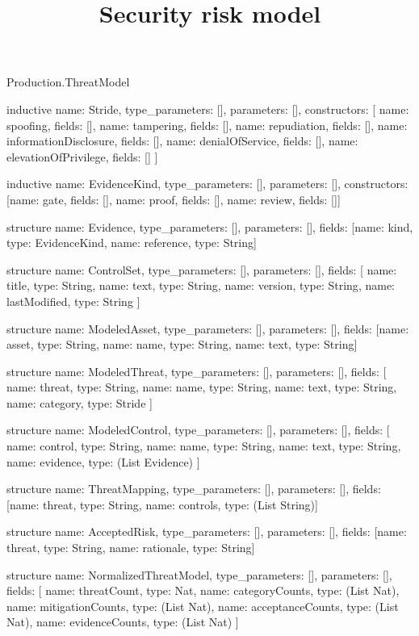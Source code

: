 \begin{lexlean}{Production.ThreatModel}
\title{Security risk model}
\begin{semanticmodule}
inductive{
  name: Stride,
  type_parameters: [],
  parameters: [],
  constructors: [
    {name: spoofing, fields: []},
    {name: tampering, fields: []},
    {name: repudiation, fields: []},
    {name: informationDisclosure, fields: []},
    {name: denialOfService, fields: []},
    {name: elevationOfPrivilege, fields: []}
  ]
}

inductive{
  name: EvidenceKind,
  type_parameters: [],
  parameters: [],
  constructors: [{name: gate, fields: []}, {name: proof, fields: []}, {name: review, fields: []}]
}

structure{
  name: Evidence,
  type_parameters: [],
  parameters: [],
  fields: [{name: kind, type: EvidenceKind}, {name: reference, type: String}]
}

structure{
  name: ControlSet,
  type_parameters: [],
  parameters: [],
  fields: [
    {name: title, type: String},
    {name: text, type: String},
    {name: version, type: String},
    {name: lastModified, type: String}
  ]
}

structure{
  name: ModeledAsset,
  type_parameters: [],
  parameters: [],
  fields: [{name: asset, type: String}, {name: name, type: String}, {name: text, type: String}]
}

structure{
  name: ModeledThreat,
  type_parameters: [],
  parameters: [],
  fields: [
    {name: threat, type: String},
    {name: name, type: String},
    {name: text, type: String},
    {name: category, type: Stride}
  ]
}

structure{
  name: ModeledControl,
  type_parameters: [],
  parameters: [],
  fields: [
    {name: control, type: String},
    {name: name, type: String},
    {name: text, type: String},
    {name: evidence, type: (List Evidence)}
  ]
}

structure{
  name: ThreatMapping,
  type_parameters: [],
  parameters: [],
  fields: [{name: threat, type: String}, {name: controls, type: (List String)}]
}

structure{
  name: AcceptedRisk,
  type_parameters: [],
  parameters: [],
  fields: [{name: threat, type: String}, {name: rationale, type: String}]
}

structure{
  name: NormalizedThreatModel,
  type_parameters: [],
  parameters: [],
  fields: [
    {name: threatCount, type: Nat},
    {name: categoryCounts, type: (List Nat)},
    {name: mitigationCounts, type: (List Nat)},
    {name: acceptanceCounts, type: (List Nat)},
    {name: evidenceCounts, type: (List Nat)}
  ]
}


\end{semanticmodule}
\end{lexlean}
